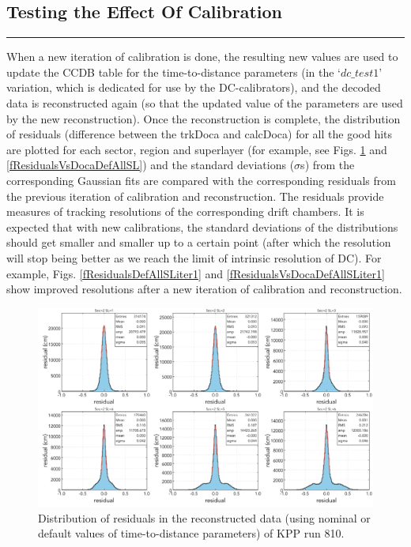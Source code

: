 \documentclass[12pt]{article}
\begin{document}
\subsection{Testing the Effect Of Calibration}
{\color{black} \rule{\linewidth}{0.5mm} }



When a new iteration of calibration is done, the resulting new values are used to update the CCDB table for the time-to-distance parameters (in the `$dc\_test1$' variation, which is dedicated for use by the DC-calibrators), and the decoded data is reconstructed again (so that the updated value of the parameters are used by the new reconstruction). Once the reconstruction is complete, the distribution of residuals (difference between the trkDoca and calcDoca) for all the good hits are plotted for each sector, region and superlayer (for example, see Figs. \ref{fResidualsDefAllSL} and \ref{fResidualsVsDocaDefAllSL}) and the standard deviations ($\sigma$s) from the corresponding Gaussian fits are compared with the corresponding residuals from the previous iteration of calibration and reconstruction. The residuals provide measures of tracking resolutions of the corresponding drift chambers. It is expected that with new calibrations, the standard deviations of the distributions should get smaller and smaller up to a certain point (after which the resolution will stop being better as we reach the limit of intrinsic resolution of DC). For example, Figs.  \ref{fResidualsDefAllSLiter1} and \ref{fResidualsVsDocaDefAllSLiter1} show improved resolutions after a new iteration of calibration and reconstruction.

\begin{figure}[H]
    \centering
    \includegraphics[width=1.0\textwidth]{Figures/residual_defaultT2D_automatedT0.png}
    \caption{Distribution of residuals in the reconstructed data (using nominal or default values of time-to-distance parameters) of KPP run 810.}
    \label{fResidualsDefAllSL}
\end{figure}
\end{document}
